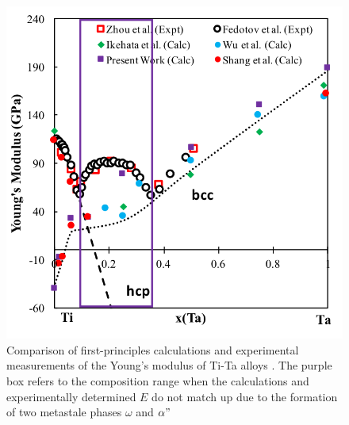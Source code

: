 \newpage
\begin{figure}[H]
	\centering
	\includegraphics{Chapter-1/Figures/TiTaElastic.png}
	\caption{Comparison of first-principles calculations \cite{Wu2010a,Ikehata2004} and experimental measurements of the Young's modulus of Ti-Ta alloys \cite{Zhou2004a,Zhou2009a,Fedotov1985}. The purple box refers to the composition range when the calculations and experimentally determined $E$ do not match up due to the formation of two metastale phases $\omega$ and $\alpha"$}
	\label{Ch1-figure:titaelastic}
\end{figure}

